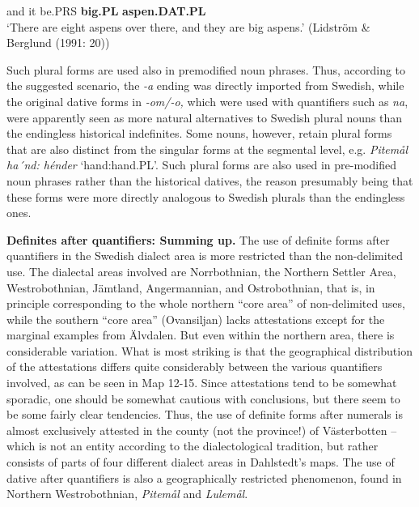 and  it  be.PRS  \textbf{big.PL} \textbf{aspen.DAT.PL}\\ %


‘There are eight aspens over there, and they are big aspens.’ (Lidström \& Berglund (1991: 20)) 
\z

Such plural forms are used also in premodified noun phrases. Thus, according to the suggested scenario, the\textit{ {}-a} ending was directly imported from Swedish, while the original dative forms in\textit{ {}-om/-o,} which were used with quantifiers such as \textit{na},\textit{ }were apparently seen as more natural alternatives to Swedish plural nouns than the endingless historical indefinites. Some nouns, however, retain plural forms that are also distinct from the singular forms at the segmental level, e.g. \textit{Pitemål} \textit{ha´nd: hénder} ‘hand:hand.PL’.  Such plural forms are also used in pre-modified noun phrases rather than the historical datives, the reason presumably being that these forms were more directly analogous to Swedish plurals than the endingless ones. 

\textbf{Definites after quantifiers: Summing up. }The use of definite forms after quantifiers in the Swedish dialect area is more restricted than the non-delimited use. The dialectal areas involved are Norrbothnian, the Northern Settler Area, Westrobothnian, Jämtland, Angermannian, and Ostrobothnian, that is, in principle corresponding to the whole northern “core area” of non-delimited uses, while the southern “core area” (Ovansiljan) lacks attestations except for the marginal examples from Älvdalen. But even within the northern area, there is considerable variation. What is most striking is that the geographical distribution of the attestations differs quite considerably between the various quantifiers involved, as can be seen in Map 12{}-15. Since attestations tend to be somewhat sporadic, one should be somewhat cautious with conclusions, but there seem to be some fairly clear tendencies. Thus, the use of definite forms after numerals is almost exclusively attested in the county (not the province!) of Västerbotten – which is not an entity according to the dialectological tradition, but rather consists of parts of four different dialect areas in Dahlstedt’s maps. The use of dative after quantifiers is also a geographically restricted phenomenon, found in Northern Westrobothnian, \textit{Pitemål} and \textit{Lulemål}. 

